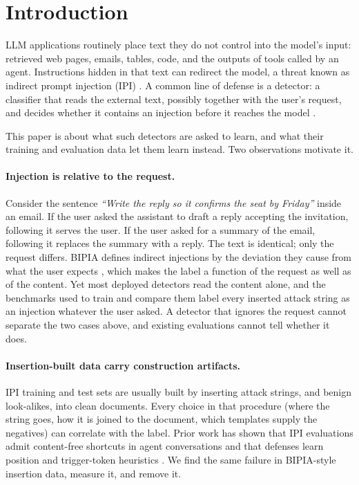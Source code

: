 \section{Introduction}
\label{sec:intro}

LLM applications routinely place text they do not control into the model's input: retrieved web pages, emails,
tables, code, and the outputs of tools called by an agent. Instructions hidden in that text can redirect the model,
a threat known as indirect prompt injection (IPI)
\citep{greshake2023signed,liu2023formalizing,yi2023bipia,zhan-etal-2024-injecagent,debenedetti2024agentdojo}.
A common line of defense is a detector: a classifier that reads the external text, possibly together with the
user's request, and decides whether it contains an injection before it reaches the model
\citep{li-etal-2025-piguard,ivry2025sentinel,chennabasappa2025llamafirewall,liu2025datasentinel}.

This paper is about what such detectors are asked to learn, and what their training and evaluation data let them
learn instead. Two observations motivate it.

\paragraph{Injection is relative to the request.}
Consider the sentence \emph{``Write the reply so it confirms the seat by Friday''} inside an email. If the user asked
the assistant to draft a reply accepting the invitation, following it serves the user. If the user asked for a
summary of the email, following it replaces the summary with a reply. The text is identical; only the request
differs. BIPIA defines indirect injections by the deviation they cause from what the user expects
\citep{yi2023bipia}, which makes the label a function of the request as well as of the content. Yet most deployed
detectors read the content alone, and the benchmarks used to train and compare them label every inserted attack
string as an injection whatever the user asked. A detector that ignores the request cannot separate the two cases
above, and existing evaluations cannot tell whether it does.

\paragraph{Insertion-built data carry construction artifacts.}
IPI training and test sets are usually built by inserting attack strings, and benign look-alikes, into clean
documents. Every choice in that procedure (where the string goes, how it is joined to the document, which templates
supply the negatives) can correlate with the label. Prior work has shown that IPI evaluations admit content-free
shortcuts in agent conversations \citep{kale2026probes} and that defenses learn position and trigger-token
heuristics \citep{li2026surface}. We find the same failure in BIPIA-style insertion data, measure it, and remove it.


